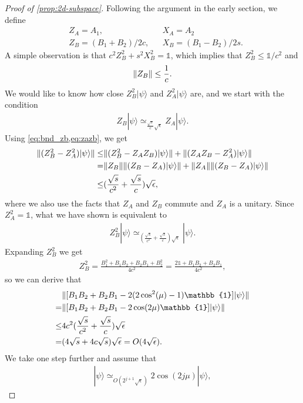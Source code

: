 \documentclass[11pt,letterpaper]{article}
\newcommand{\ket}[1]{|#1\rangle}
\DeclarePairedDelimiter{\norm}{\lVert}{\rVert}
\newcommand{\1}{\mathbb{1}}
\newcommand{\appd}[1]{\simeq_{#1}}
\theoremstyle{definition}
\begin{document}
\begin{proof}[Proof of \cref{prop:2d-subspace}]
	Following the argument in the early section, we define
	\begin{align*}	
	&Z_A = A_1, && X_A = A_2\\
	&Z_B = (B_1+B_2)/2c, && X_B = (B_1-B_2)/2s.
	\end{align*}
	A simple observation is that $c^2 Z_B^2 + s^2 X_B^2 = \1$, which implies that 
	$ Z_B^2 \leq \1/c^2$ and 
	\begin{align}
		\label{eq:bnd_zb}
		\norm{Z_B} \leq \frac{1}{c}.
	\end{align}
	We would like to know how close $Z_B^2\ket{\psi}$ and $Z_A^2\ket{\psi}$ are,
	and we start with the condition 
	\begin{align}
		\label{eq:zazb}
		Z_B \ket{\psi} \appd{\frac{\sqrt{s}}{c}\sqrt{\epsilon}} Z_A \ket{\psi}.
	\end{align}
	Using \cref{eq:bnd_zb,eq:zazb}, we get
	\begin{align}
		\norm{ (Z_B^2 - Z_A^2)\ket{\psi}} \leq& \norm{ (Z_B^2 - Z_AZ_B)\ket{\psi}} + \norm{ (Z_AZ_B - Z_A^2)\ket{\psi}}\\
		=&\norm{Z_B}\norm{ (Z_B - Z_A)\ket{\psi}} + \norm{Z_A}\norm{ (Z_B - Z_A)\ket{\psi}}\\
		\leq&(\frac{\sqrt{s}}{c^2}+ \frac{\sqrt{s}}{c})\sqrt{\epsilon},
	\end{align}
	where we also use the facts that $Z_A$ and $Z_B$ commute and $Z_A$ is a unitary.
	Since $Z_A^2 = \1$, what we have shown is equivalent to 
	\begin{align}
		Z_B^2 \ket{\psi} \appd{(\frac{\sqrt{s}}{c^2}+ \frac{\sqrt{s}}{c})\sqrt{\epsilon}} \ket{\psi}.
	\end{align}
	Expanding $Z_B^2$ we get
	\begin{align*}
		 Z_B^2 = \frac{B_1^2 + B_1B_2 + B_2B_1 + B_2^2}{4c^2}
		=\frac{2\1 + B_1B_2 + B_2B_1}{4c^2},
	\end{align*}
	so we can derive that 
	\begin{align*}
		&\norm{[B_1 B_2 + B_2 B_1 - 2(2\cos^2(\mu)-1)\1]\ket{\psi}} \\
		=& \norm{ [B_1B_2 + B_2B_1 - 2 \cos(2\mu) \1]\ket{\psi}} \\
		\leq& 4c^2(\frac{\sqrt{s}}{c^2}+ \frac{\sqrt{s}}{c})\sqrt{\epsilon} \\
		=& (4\sqrt{s} + 4c\sqrt{s})\sqrt{\epsilon}
		= O(4\sqrt{\epsilon}).
	\end{align*}
	We take one step further and assume that 
	\begin{align}
		[(B_1B_2)^j + (B_2B_1)^j]\ket{\psi} \appd{O(2^{j+1}\sqrt{\epsilon})} 2\cos(2j\mu) \ket{\psi},

\end{align}
\end{proof}
\end{document}
